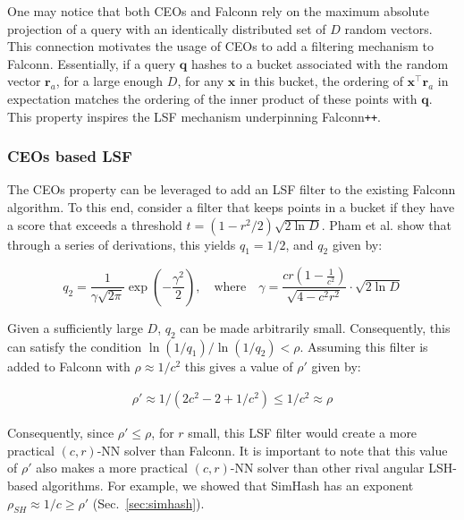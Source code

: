 \documentclass{article}
\newcommand{\bx}{\mathbf{x}}
\newcommand{\br}{\mathbf{r}}
\newcommand{\bq}{\mathbf{q}}
\newcommand{\fpp}{Falconn\texttt{++}\xspace}
\newcommand{\crNN}{$(c, r)$-NN\xspace}
\begin{document}
One may notice that both CEOs and Falconn rely on the maximum absolute projection of a query with an identically distributed set of $D$ random vectors. This connection motivates the usage of CEOs to add a filtering mechanism to Falconn. Essentially, if a query $\bq$ hashes to a bucket associated with the random vector $\br_a$, for a large enough $D$, for any $\bx$ in this bucket, the ordering of $\bx ^\top \br_a$ in expectation matches the ordering of the inner product of these points with $\bq$. This property inspires the LSF mechanism underpinning \fpp.


\subsubsection{CEOs based LSF}
\label{sec:ceos-lsf}

The CEOs property can be leveraged to add an LSF filter to the existing Falconn algorithm. To this end, consider a filter that keeps points in a bucket if they have a score that exceeds a threshold $t=(1-r^2/2){\sqrt{2\ln D}}$. Pham et al. show that through a series of derivations, this yields $q_1 = 1/2$, and $q_2$ given by:

\[
q_2
=
\frac{1}{\gamma \sqrt{2\pi}}
\exp\!\left(-\frac{\gamma^2}{2}\right),
\quad
\text{where} \quad \gamma
=
\frac{cr\left(1-\frac{1}{c^2}\right)}{\sqrt{4-c^2r^2}}
\cdot \sqrt{2\ln D}
\]

Given a sufficiently large $D$, $q_2$ can be made arbitrarily small. Consequently, this can satisfy the condition $\ln(1/q_1)/\ln(1/q_2) < \rho$. Assuming this filter is added to Falconn with $\rho \approx  1/c^2$ this gives a value of $\rho'$ given by:

\begin{equation}
    \begin{aligned}
        \rho'\approx 1/(2c^2 - 2 + 1/c^2) \leq 1/c^2 \approx \rho
    \end{aligned}
\end{equation}

Consequently, since $\rho' \leq \rho$, for $r$ small, this LSF filter would create a more practical \crNN solver than Falconn. It is important to note that this value of $\rho'$ also makes a more practical \crNN solver than other rival angular LSH-based algorithms. For example, we showed that SimHash has an exponent $\rho_{SH} \approx 1/c \geq \rho'$ (Sec.~\ref{sec:simhash}). 
\end{document}

